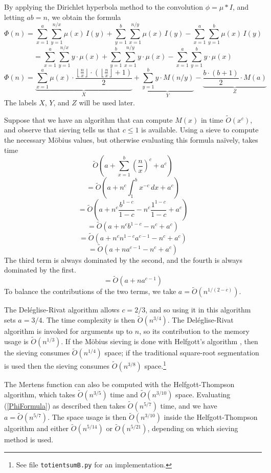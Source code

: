 \documentclass[12pt]{article}
\newcommand{\eqn}[1]{\begin{displaymath} #1 \end{displaymath}}
\newcommand{\neqn}[1]{\begin{equation} #1 \end{equation}}
\newcommand{\floor}[1]{{\left\lfloor #1 \right\rfloor}}
\newcommand{\integral}[4]{\displaystyle\int_{#3}^{#4} \! #1 \, d#2}
\newcommand{\floordiv}[2]{\floor{\frac{#1}{#2}}}
\newcommand{\softO}[0]{\widetilde{O}}
\begin{document}
By applying the Dirichlet hyperbola method to the convolution $\phi = \mu * I$, and letting $ab=n$, we obtain the formula
\eqn{\Phi(n) = \sum_{x=1}^{a}\sum_{y=1}^{n/x} \mu(x) \, I(y) + \sum_{y=1}^{b}\sum_{x=1}^{n/y} \mu(x) \, I(y) - \sum_{x=1}^{a}\sum_{y=1}^{b} \mu(x) \, I(y)}
\eqn{ = \sum_{x=1}^{a}\sum_{y=1}^{n/x} y \cdot \mu(x) + \sum_{y=1}^{b}\sum_{x=1}^{n/y} y \cdot \mu(x) - \sum_{x=1}^{a}\sum_{y=1}^{b} y \cdot \mu(x)}
\neqn{\Phi(n) = \underbrace{\sum_{x=1}^{a} \mu(x) \cdot \frac{\floordiv{n}{x} \cdot \left(\floordiv{n}{x} + 1\right)}{2}}_{X} + \underbrace{\sum_{y=1}^{b} y \cdot M(n/y)}_{Y} - \underbrace{\frac{b \cdot (b+1)}{2} \cdot M(a)}_{Z} \label{PhiFormula}}
The labels $X$, $Y$, and $Z$ will be used later.

Suppose that we have an algorithm that can compute $M(x)$ in time $\softO(x^c)$, and observe that sieving tells us that $c\leq1$ is available.  Using a sieve to compute the necessary M\"obius values, but otherwise evaluating this formula na\"{i}vely, takes time
\eqn{\softO\left( a + \sum_{x=1}^b \left(\frac{n}{x}\right)^c + a^c \right)}
\eqn{=\softO\left( a + n^c \integral{x^{-c}}{x}{1}{b} + a^c \right)}
\eqn{=\softO\left( a + n^c\frac{b^{1-c}}{1-c} - n^c\frac{1^{1-c}}{1-c} + a^c \right)}
\eqn{=\softO\left( a + n^c b^{1-c} - n^c + a^c \right)}
\eqn{=\softO\left( a + n^c n^{1-c} a^{c-1} - n^c + a^c \right)}
\eqn{=\softO\left( a + n a^{c-1} - n^c + a^c \right)}
The third term is always dominated by the second, and the fourth is always dominated by the first.
\eqn{=\softO\left( a + n a^{c-1} \right)}
To balance the contributions of the two terms, we take $a = \softO(n^{1/(2-c)})$.

The Del\'{e}glise-Rivat algorithm \cite{DR1996} allows $c=2/3$, and so using it in this algorithm sets $a=3/4$.  The time complexity is then $\softO(n^{3/4})$. 
 The Del\'{e}glise-Rivat algorithm is invoked for arguments up to $n$, so its contribution to the memory usage is $\softO(n^{1/3})$.  If the M\"{o}bius sieving is done with Helfgott's algorithm \cite{Helfgott2020}, then the sieving consumes $\softO(n^{1/4})$ space; if the traditional square-root segmentation is used then the sieving consumes $\softO(n^{3/8})$ space.\footnote{See file \texttt{totientsumB.py} for an implementation.}

The Mertens function can also be computed with the Helfgott-Thompson algorithm, which takes $\softO(n^{3/5})$ time and $\softO(n^{3/10})$ space.  Evaluating (\ref{PhiFormula}) as described then takes $\softO(n^{5/7})$ time, and we have $a = \softO(n^{5/7})$.  The space usage is then $\softO(n^{3/10})$ inside the Helfgott-Thompson algorithm and either $\softO(n^{5/14})$ or $\softO(n^{5/21})$, depending on which sieving method is used.
\end{document}
